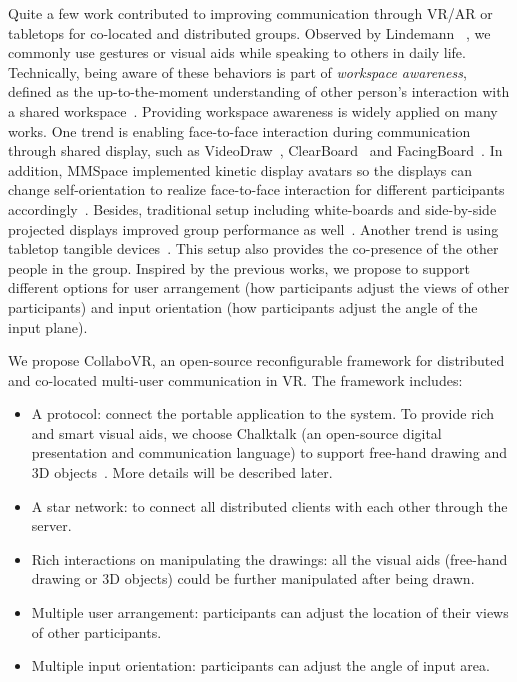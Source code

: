\documentclass{sigchi}
\begin{document}
Quite a few work contributed to improving communication through VR/AR or tabletops for co-located and distributed groups. Observed by Lindemann ~\cite{tversky2003human}, we commonly use gestures or visual aids while speaking to others in daily life. Technically, being aware of these behaviors is part of \textit{workspace awareness}, defined as the up-to-the-moment understanding of other person's interaction with a shared workspace~\cite{li2014interactive}. Providing workspace awareness is widely applied on many works. 
One trend is enabling face-to-face interaction during communication through shared display, such as VideoDraw~\cite{tang1990videodraw}, ClearBoard~\cite{ishii1993integration} and FacingBoard~\cite{li2014interactive}. In addition, MMSpace implemented kinetic display avatars so the displays can change self-orientation to realize face-to-face interaction for different participants accordingly~\cite{otsuka2016mmspace}. Besides, traditional setup including white-boards and side-by-side projected displays improved group performance as well~\cite{plaue2009presence}. Another trend is using tabletop tangible devices~\cite{brave1998tangible, kunert2019multi}. 
This setup also provides the co-presence of the other people in the group. Inspired by the previous works, we propose to support different options for user arrangement (how participants adjust the views of other participants) and input orientation (how participants adjust the angle of the input plane).

We propose CollaboVR, an open-source reconfigurable framework for distributed and co-located multi-user communication in VR. The framework includes:
\begin{itemize}
    \item A protocol: connect the portable application to the system. To provide rich and smart visual aids, we choose Chalktalk (an open-source digital presentation and communication language) to support free-hand drawing and 3D objects~\cite{perlin2018chalktalk}. More details will be described later.
    \item A star network: to connect all distributed clients with each other through the server.
    \item Rich interactions on manipulating the drawings: all the visual aids (free-hand drawing or 3D objects) could be further manipulated after being drawn.
    \item Multiple user arrangement: participants can adjust the location of their views of other participants.
    \item Multiple input orientation: participants can adjust the angle of input area.
\end{itemize}
\end{document}
